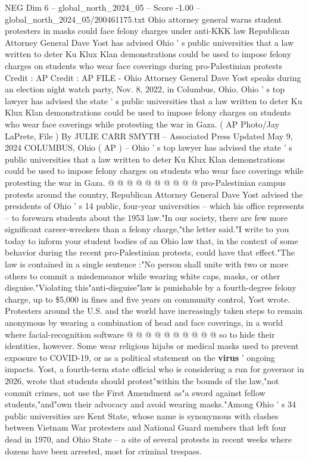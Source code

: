 \begin{textsample}{NEG Dim 6 – global\_north\_2024\_05 – Score -1.00 – global\_north\_2024\_05/200461175.txt}  \label{ex:f6_neg_287}
Ohio attorney general warns student protesters in masks could face felony charges under anti-KKK law Republican Attorney General Dave Yost has advised Ohio ' s public universities that a law written to deter Ku Klux Klan demonstrations could be used to impose felony charges on students who wear face coverings during pro-Palestinian protests Credit : AP Credit : AP FILE - Ohio Attorney General Dave Yost speaks during an election night watch party, Nov. 8, 2022, in Columbus, Ohio.
Ohio ' s top lawyer has advised the state ' s public universities that a law written to deter Ku Klux Klan demonstrations could be used to impose felony charges on students who wear face coverings while protesting the war in Gaza. ( AP Photo/Jay LaPrete, File ) By JULIE CARR SMYTH -- Associated Press Updated May 9, 2024 COLUMBUS, Ohio ( AP ) -- Ohio ' s top lawyer has advised the state ' s public universities that a law written to deter Ku Klux Klan demonstrations could be used to impose felony charges on students who wear face coverings while protesting the war in Gaza. @ @ @ @ @ @ @ @ @ @ pro-Palestinian campus protests around the country, Republican Attorney General Dave Yost advised the presidents of Ohio ' s 14 public, four-year universities -- which his office represents -- to forewarn students about the 1953 law."In our society, there are few more significant career-wreckers than a felony charge,"the letter said."I write to you today to inform your student bodies of an Ohio law that, in the context of some behavior during the recent pro-Palestinian protests, could have that effect."The law is contained in a single sentence :"No person shall unite with two or more others to commit a misdemeanor while wearing white caps, masks, or other disguise."Violating this"anti-disguise"law is punishable by a fourth-degree felony charge, up to \$5,000 in fines and five years on community control, Yost wrote.
Protesters around the U.S. and the world have increasingly taken steps to remain anonymous by wearing a combination of head and face coverings, in a world where facial-recognition software @ @ @ @ @ @ @ @ @ @ so to hide their identities, however.
Some wear religious hijabs or medical masks used to prevent exposure to COVID-19, or as a political statement on the \textbf{virus} ' ongoing impacts.
Yost, a fourth-term state official who is considering a run for governor in 2026, wrote that students should protest"within the bounds of the law,"not commit crimes, not use the First Amendment as"a sword against fellow students,"and"own their advocacy and avoid wearing masks."Among Ohio ' s 34 public universities are Kent State, whose name is synonymous with clashes between Vietnam War protesters and National Guard members that left four dead in 1970, and Ohio State -- a site of several protests in recent weeks where dozens have been arrested, most for criminal trespass.

\end{textsample}
